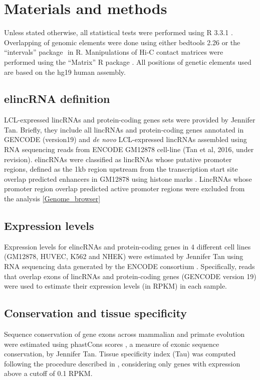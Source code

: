 \documentclass[11pt,a4paper]{report}
\begin{document}
\section*{Materials and methods}
Unless stated otherwise, all statistical tests were performed using R 3.3.1 \cite{RCoreTeam2016}⁠. Overlapping of genomic elements were done using either bedtools 2.26 \cite{Quinlan2010}⁠or the “intervals” package \cite{Bourgon2015}⁠ in R. Manipulations of Hi-C contact matrices were performed using the “Matrix” R package \cite{Bates2016}⁠. All positions of genetic elements used are based on the hg19 human assembly.

\subsection*{elincRNA definition}

LCL-expressed lincRNAs and protein-coding genes sets were provided by Jennifer Tan. Briefly, they include all lincRNAs and protein-coding genes annotated in GENCODE (version19) and \textit{de novo} LCL-expressed lincRNAs assembled using RNA sequencing reads from ENCODE GM12878 cell-line (Tan et al, 2016, under revision). elincRNAs were classified as lincRNAs whose putative promoter regions, defined as the 1kb region upstream from the transcription start site overlap predicted enhancers in GM12878 using histone marks \cite{ENCODEProject2012}⁠. LincRNAs whose promoter region overlap predicted active promoter regions were excluded from the analysis \ref{Genome_browser}

\subsection*{Expression levels}

Expression levels for elincRNAs and protein-coding genes in 4  different cell lines (GM12878, HUVEC, K562 and NHEK) were estimated by Jennifer Tan using RNA sequencing data generated by the ENCODE consortium \cite{ENCODEProject2012}. Specifically, reads that overlap exons of lincRNAs and protein-coding genes (GENCODE version 19) were used to estimate their expression levels (in RPKM) in each sample.

\subsection*{Conservation and tissue specificity}

Sequence conservation of gene exons across mammalian and primate evolution were estimated using phastCons scores \cite{Siepel2005}⁠, a measure of exonic sequence conservation, by Jennifer Tan. Tissue specificity index (Tau) was computed following the procedure described in \cite{Kryuchkova2015a}, considering only genes with expression above a cutoff of 0.1 RPKM.
\end{document}
